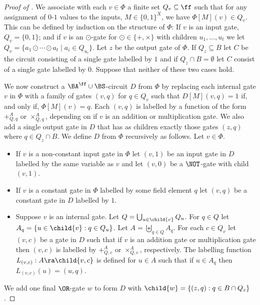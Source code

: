 \documentclass{toc}
\begin{document}
\begin{proof}[Proof of ]
  We associate with each $v \in \Phi$ a finite set $Q_v \subseteq \ff$
  such that for any assignment of $0$-$1$ values to the inputs, $M \in
  \{0,1\}^X$, we have $\Phi[M](v) \in Q_v$.  This can be defined by
  induction on the structure of $\Phi$: If $v$ is an input gate, $Q_v
  = \{0,1\}$; and if $v$ is an $\odot$-gate for $\odot \in
  \{+,\times\}$ with children $u_1,\ldots,u_t$  we let $Q_v = \{
  a_1\odot \cdots \odot a_t \mid a_i \in Q_{u_i} \}$.
  Let $z$ be the output gate of $\Phi$. If $Q_z \subseteq B$ let $C$ be the
  circuit consisting of a single gate labelled by $1$ and if $Q_z \cap B =
  \emptyset$ let $C$ consist of a single gate labelled by $0$. Suppose that
  neither of these two cases hold.

  We now construct a $\BA^{\ff}\cup \BS$-circuit $D$ from $\Phi$ by replacing
  each internal gate $v$ in $\Phi$ with a family of gates $(v, q)$ for $q \in
  Q_v$ such that $D[M](v, q) = 1$ if, and only if, $\Phi[M](v) = q$. Each $(v,
  q)$ is labelled by a function of the form $+^A_{Q, q}$ or $\times^A_{Q, q}$,
  depending on if $v$ is an addition or multiplication gate. We also add a
  single output gate in $D$ that has as children exactly those gates $(z, q)$
  where $q \in Q_z \cap B$. We define $D$ from $\Phi$ recursively as follows.
  Let $v \in \Phi$.
  \begin{itemize}
  \item If $v$ is a non-constant input gate in $\Phi$ let $(v, 1)$ be an input
    gate in $D$ labelled by the same variable as $v$ and let $(v, 0)$ be a
    $\NOT$-gate with child $(v, 1)$.
  \item If $v$ is a constant gate in $\Phi$ labelled by some field element $q$
    let $(v, q)$ be a constant gate in $D$ labelled by $1$.
  \item Suppose $v$ is an internal gate. Let $Q = \bigcup_{u \in \child{v}}Q_u$.
    For $q \in Q$ let $A_q = \{u \in \child{v} : q \in Q_u\}$. Let $A =
    \biguplus_{q \in Q}A_q$. For each $c \in Q_v$ let $(v, c)$ be a gate in $D$
    such that if $v$ is an addition gate or multiplication gate then $(v, c)$ is
    labelled by $+^A_{Q, c}$ or $\times^A_{Q, c}$, respectively. The labelling
    function $L_{(v, c)} : A \ra \child{v, c}$ is defined for $u \in A$ such
    that if $u \in A_q$ then $L_{(v, c)} (u) = (u, q)$.
  \end{itemize}
  We add one final $\OR$-gate $w$ to form $D$ with $\child{w} = \{(z, q) : q \in
  B \cap Q_z\}$.


\end{proof}
\end{document}
